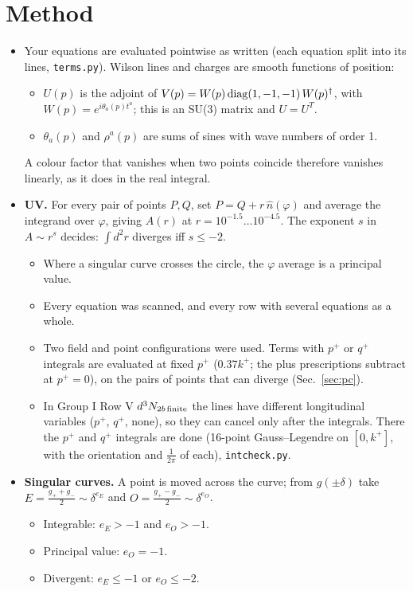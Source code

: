 \documentclass[10pt]{article}
\begin{document}
\section{Method}
\begin{itemize}
\item Your equations are evaluated pointwise as written (each equation split into its lines, \texttt{terms.py}). Wilson lines and charges are smooth functions of position:
\begin{itemize}
\item $U(p)$ is the adjoint of $V(p)=W(p)\,{\rm diag}(1,-1,-1)\,W(p)^\dagger$, with $W(p)=e^{i\theta_a(p)t^a}$; this is an SU(3) matrix and $U=U^T$.
\item $\theta_a(p)$ and $\rho^a(p)$ are sums of sines with wave numbers of order 1.
\end{itemize}
A colour factor that vanishes when two points coincide therefore vanishes linearly, as it does in the real integral.
\item \textbf{UV.} For every pair of points $P,Q$, set $P=Q+r\,\hat n(\varphi)$ and average the integrand over $\varphi$, giving $A(r)$ at $r=10^{-1.5}\dots10^{-4.5}$. The exponent $s$ in $A\sim r^s$ decides: $\int d^2r$ diverges iff $s\le-2$.
\begin{itemize}
\item Where a singular curve crosses the circle, the $\varphi$ average is a principal value.
\item Every equation was scanned, and every row with several equations as a whole.
\item Two field and point configurations were used. Terms with $p^+$ or $q^+$ integrals are evaluated at fixed $p^+$ ($0.37k^+$; the plus prescriptions subtract at $p^+=0$), on the pairs of points that can diverge (Sec.~\ref{sec:pc}).
\item In Group I Row V $d^3N_{2b\,\rm finite}$ the lines have different longitudinal variables ($p^+$, $q^+$, none), so they can cancel only after the integrals. There the $p^+$ and $q^+$ integrals are done (16-point Gauss--Legendre on $[0,k^+]$, with the orientation and $\frac{1}{2\pi}$ of each), \texttt{intcheck.py}.
\end{itemize}
\item \textbf{Singular curves.} A point is moved across the curve; from $g(\pm\delta)$ take $E=\frac{g_++g_-}{2}\sim\delta^{e_E}$ and $O=\frac{g_+-g_-}{2}\sim\delta^{e_O}$.
\begin{itemize}
\item Integrable: $e_E>-1$ and $e_O>-1$.
\item Principal value: $e_O=-1$.
\item Divergent: $e_E\le-1$ or $e_O\le-2$.
\end{itemize}
\end{itemize}
\end{document}

